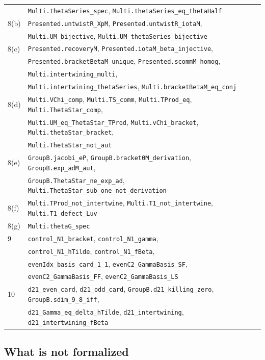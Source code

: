 \documentclass[11pt]{article}
\numberwithin{equation}{section}
\theoremstyle{definition}
\theoremstyle{remark}
\begin{document}
{\begin{longtable}{ll}
  & \texttt{Multi.thetaSeries\_spec}, \texttt{Multi.thetaSeries\_eq\_thetaHalf}\\
8(b) & \texttt{Presented.untwistR\_XpM}, \texttt{Presented.untwistR\_iotaM},\\
  & \texttt{Multi.UM\_bijective}, \texttt{Multi.UM\_thetaSeries\_bijective}\\
8(c) & \texttt{Presented.recoveryM}, \texttt{Presented.iotaM\_beta\_injective},\\
  & \texttt{Presented.bracketBetaM\_unique}, \texttt{Presented.scommM\_homog},\\
  & \texttt{Multi.intertwining\_multi},\\
  & \texttt{Multi.intertwining\_thetaSeries}, \texttt{Multi.bracketBetaM\_eq\_conj}\\
8(d) & \texttt{Multi.VChi\_comp}, \texttt{Multi.TS\_comm}, \texttt{Multi.TProd\_eq},
    \texttt{Multi.ThetaStar\_comp},\\
  & \texttt{Multi.UM\_eq\_ThetaStar\_TProd}, \texttt{Multi.vChi\_bracket},
    \texttt{Multi.thetaStar\_bracket},\\
  & \texttt{Multi.ThetaStar\_not\_aut}\\
8(e) & \texttt{GroupB.jacobi\_eP}, \texttt{GroupB.bracket0M\_derivation},
    \texttt{GroupB.exp\_adM\_aut},\\
  & \texttt{GroupB.ThetaStar\_ne\_exp\_ad}, \texttt{Multi.ThetaStar\_sub\_one\_not\_derivation}\\
8(f) & \texttt{Multi.TProd\_not\_intertwine}, \texttt{Multi.T1\_not\_intertwine},
    \texttt{Multi.T1\_defect\_Luv}\\
8(g) & \texttt{Multi.thetaG\_spec}\\
9 & \texttt{control\_N1\_bracket}, \texttt{control\_N1\_gamma},\\
  & \texttt{control\_N1\_hTilde}, \texttt{control\_N1\_fBeta},\\
  & \texttt{evenIdx\_basis\_card\_1\_1}, \texttt{evenC2\_GammaBasis\_SF},\\
  & \texttt{evenC2\_GammaBasis\_FF}, \texttt{evenC2\_GammaBasis\_LS}\\
10 & \texttt{d21\_even\_card}, \texttt{d21\_odd\_card}, \texttt{GroupB.d21\_killing\_zero},
     \texttt{GroupB.sdim\_9\_8\_iff},\\
  & \texttt{d21\_Gamma\_eq\_delta\_hTilde}, \texttt{d21\_intertwining}, \texttt{d21\_intertwining\_fBeta}
\end{longtable}}

\subsection{What is not formalized}\label{subsec:not-formalized}
\end{document}
